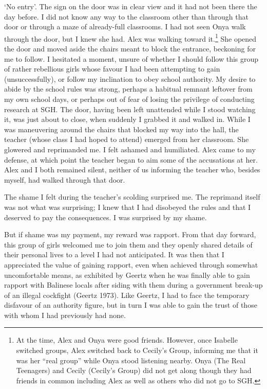 `No entry'.  The sign on the door was in clear view and it had not been there the day before.  I did not know any way to the classroom other than through that door or through a maze of already-full classrooms.  I had not seen Onya walk through the door, but I knew she had.  Alex was walking toward it.\footnote{At the time, Alex and Onya were good friends.  However, once Isabelle switched groups, Alex switched back to Cecily's Group, informing me that it was her ``real group'' while Onya stood listening nearby.  Onya (The Real Teenagers) and Cecily (Cecily's Group) did not get along though they had friends in common including Alex as well as others who did not go to SGH.}  She opened the door and moved aside the chairs meant to block the entrance, beckoning for me to follow.  I hesitated a moment, unsure of whether I should follow this group of rather rebellious girls whose favour I had been attempting to gain (unsuccessfully), or follow my inclination to obey school authority.  My desire to abide by the school rules was strong, perhaps a habitual remnant leftover from my own school days, or perhaps out of fear of losing the privilege of conducting research at SGH.  The door, having been left unattended while I stood watching it, was just about to close, when suddenly I grabbed it and walked in.  While I was maneuvering around the chairs that blocked my way into the hall, the teacher (whose class I had hoped to attend) emerged from her classroom.  She glowered and reprimanded me.  I felt ashamed and humiliated.  Alex came to my defense, at which point the teacher began to aim some of the accusations at her.  Alex and I both remained silent, neither of us informing the teacher who, besides myself, had walked through that door.

The shame I felt during the teacher's scolding surprised me.  The reprimand itself was not what was surprising; I knew that I had disobeyed the rules and that I deserved to pay the consequences.  I was surprised by my shame. 

But if shame was my payment, my reward was rapport.  From that day forward, this group of girls welcomed me to join them and they openly shared details of their personal lives to a level I had not anticipated.  It was then that I appreciated the value of gaining rapport, even when achieved through somewhat uncomfortable means, as exhibited by Geertz when he was finally able to gain rapport with Balinese locals after siding with them during a government break-up of an illegal cockfight (Geertz 1973).  Like Geertz, I had to face the temporary disfavour of an authority figure, but in turn I was able to gain the trust of those with whom I had previously had none.  

